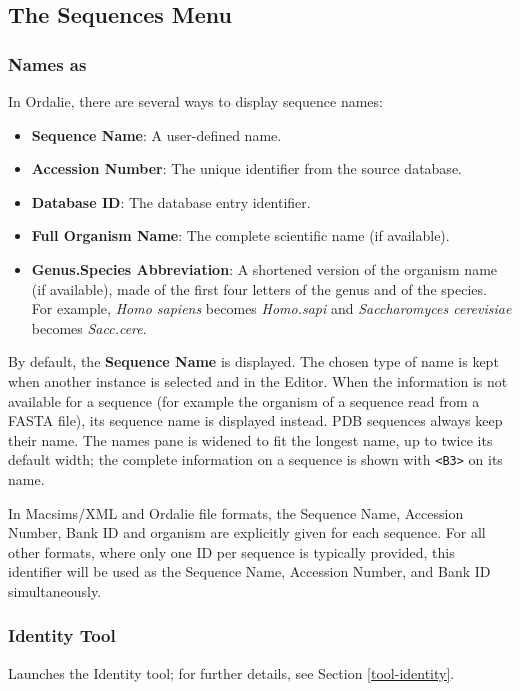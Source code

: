 \documentclass[a4paper]{article}
\begin{document}
\subsection{The Sequences Menu}

\subsubsection{Names as}
In Ordalie, there are several ways to display sequence names:
\begin{itemize}
    \item \textbf{Sequence Name}: A user-defined name.
    \item \textbf{Accession Number}: The unique identifier from the source database.
    \item \textbf{Database ID}: The database entry identifier.
    \item \textbf{Full Organism Name}: The complete scientific name (if available).
    \item \textbf{Genus.Species Abbreviation}: A shortened version of the organism name (if available), made of the first four letters of the genus and of the species. For example, \textit{Homo sapiens} becomes \textit{Homo.sapi} and \textit{Saccharomyces cerevisiae} becomes \textit{Sacc.cere}.
\end{itemize}

By default, the \textbf{Sequence Name} is displayed. The chosen type of name is kept when another instance is selected and in the Editor. When the information is not available for a sequence (for example the organism of a sequence read from a FASTA file), its sequence name is displayed instead. PDB sequences always keep their name. The names pane is widened to fit the longest name, up to twice its default width; the complete information on a sequence is shown with \texttt{<B3>} on its name.

In Macsims/XML and Ordalie file formats, the Sequence Name, Accession Number, Bank ID and organism are explicitly given for each sequence. For all other formats, where only one ID per sequence is typically provided, this identifier will be used as the Sequence Name, Accession Number, and Bank ID simultaneously.

\subsubsection{Identity Tool}
Launches the Identity tool; for further details, see Section \ref{tool-identity}.
\end{document}
